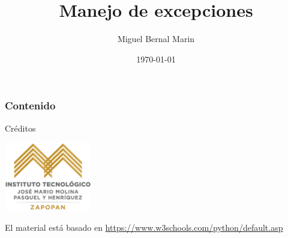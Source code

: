 \documentclass[aspectratio=169]{beamer}
\title{Manejo de excepciones}
\author{Miguel Bernal Marin}
\institute[TecMM Zapopan] %
{
 Instituto Tecnológico\\
 José Mario Molina\\
 Pasquel y Henríquez\\%
\medskip
\textit{miguel.bernal@zapopan.tecmm.edu.mx} %
}
\date{
    \today
} %
\newcommand{\nologo}{\setbeamertemplate{logo}{}} %
\begin{document}
\begin{frame}
    \titlepage
\end{frame}

\begin{frame}
    \frametitle{Contenido}
    \tableofcontents
\end{frame}



{\nologo
\begin{frame}[c]{Créditos}
  \begin{center}
    \includegraphics[height=3cm]{tecmm-z-logo.png}
  \end{center}
  \vspace{\baselineskip}
  El material está basado en
  \href{https://www.w3schools.com/python/default.asp}{https://www.w3schools.com/python/default.asp}
\end{frame}
}
\end{document}
